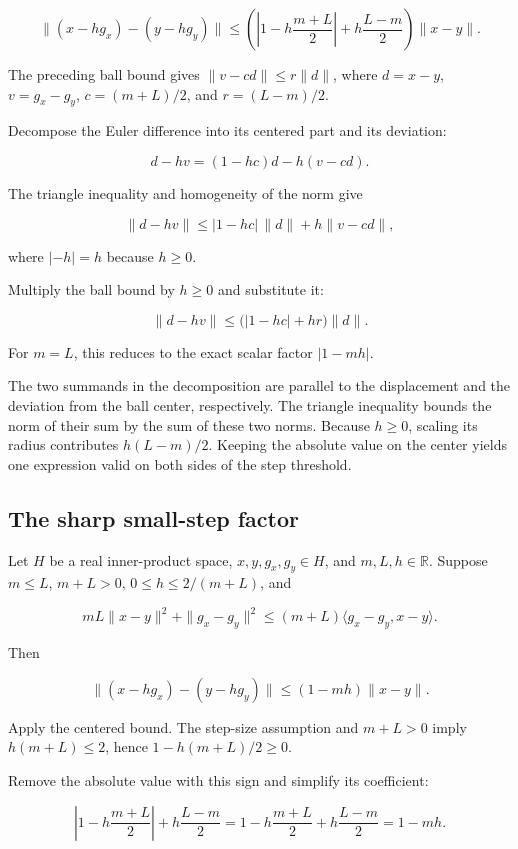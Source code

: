 \documentclass[11pt,a4paper]{article}
\begin{document}
\[\|(x-hg_x)-(y-hg_y)\|\le\left(\left|1-h\frac{m+L}{2}\right|+h\frac{L-m}{2}\right)\|x-y\|.\]

The preceding ball bound gives \(\|v-cd\|\le r\|d\|\), where \(d=x-y\), \(v=g_x-g_y\), \(c=(m+L)/2\), and \(r=(L-m)/2\).



Decompose the Euler difference into its centered part and its deviation:

\[d-hv=(1-hc)d-h(v-cd).\]

The triangle inequality and homogeneity of the norm give

\[\|d-hv\|\le|1-hc|\,\|d\|+h\|v-cd\|,\]

where \(|-h|=h\) because \(h\ge0\).



Multiply the ball bound by \(h\ge0\) and substitute it:

\[\|d-hv\|\le\bigl(|1-hc|+hr\bigr)\|d\|.\]

For \(m=L\), this reduces to the exact scalar factor \(|1-mh|\).



The two summands in the decomposition are parallel to the displacement and the deviation from the ball center, respectively. The triangle inequality bounds the norm of their sum by the sum of these two norms. Because \(h\ge0\), scaling its radius contributes \(h(L-m)/2\). Keeping the absolute value on the center yields one expression valid on both sides of the step threshold.


\subsection{\texorpdfstring{The sharp small-step factor}{The sharp small-step factor}}


Let \(H\) be a real inner-product space, \(x,y,g_x,g_y\in H\), and \(m,L,h\in\mathbb R\). Suppose \(m\le L\), \(m+L>0\), \(0\le h\le2/(m+L)\), and

\[mL\|x-y\|^2+\|g_x-g_y\|^2\le(m+L)\langle g_x-g_y,x-y\rangle.\]

Then

\[\|(x-hg_x)-(y-hg_y)\|\le(1-mh)\|x-y\|.\]

Apply the centered bound. The step-size assumption and \(m+L>0\) imply \(h(m+L)\le2\), hence \(1-h(m+L)/2\ge0\).



Remove the absolute value with this sign and simplify its coefficient:

\[\left|1-h\frac{m+L}{2}\right|+h\frac{L-m}{2}=1-h\frac{m+L}{2}+h\frac{L-m}{2}=1-mh.\]
\end{document}
